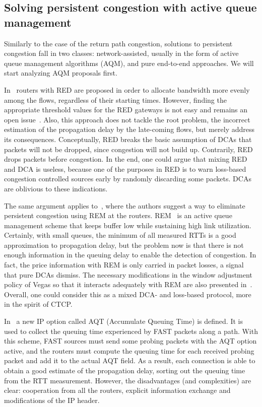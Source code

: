 \documentclass[english,times]{ettauth}
\begin{document}
\subsection{Solving persistent congestion with active queue management}
\label{sec:active-queue-manag}

Similarly to the case of the return path congestion, solutions to persistent
congestion fall in two classes: network-assisted, usually in the form of
active queue management algorithms (AQM), and pure end-to-end approaches. We
will start analyzing AQM proposals first.

In~\cite{La99} routers with RED are proposed in order to allocate bandwidth
more evenly among the flows, regardless of their starting times. However,
finding the appropriate threshold values for the RED gateways is not easy and
remains an open issue~\cite{Alemu04}. Also, this approach does not tackle the
root problem, the incorrect estimation of the propagation delay by the
late-coming flows, but merely address its consequences. Conceptually, RED
breaks the basic assumption of DCAs that packets will not be dropped, since
congestion will not build up. Contrarily, RED drops packets before congestion.
In the end, one could argue that mixing RED and DCA is useless, because one of
the purposes in RED is to warn loss-based congestion controlled sources early
by randomly discarding some packets. DCAs are oblivious to these indications.

The same argument applies to~\cite{Low02}, where the authors suggest a way to
eliminate persistent congestion using REM at the routers.
REM~\cite{Athuraliya01} is an active queue management scheme that keeps buffer
low while sustaining high link utilization. Certainly, with small queues, the
minimum of all measured RTTs is a good approximation to propagation delay, but
the problem now is that there is not enough information in the queuing delay
to enable the detection of congestion. In fact, the price information with REM
is only carried in packet losses, a signal that pure DCAs dismiss. The
necessary modifications in the window adjustment policy of Vegas so that it
interacts adequately with REM are also presented in~\cite{Low02}. Overall, one
could consider this as a mixed DCA- and loss-based protocol, more in the
spirit of CTCP.

In~\cite{Chan04} a new IP option called AQT (Accumulate Queuing Time) is
defined. It is used to collect the queuing time experienced by FAST packets
along a path.  With this scheme, FAST sources must send some probing packets
with the AQT option active, and the routers must compute the queuing time for
each received probing packet and add it to the actual AQT field. As a result,
each connection is able to obtain a good estimate of the propagation delay,
sorting out the queuing time from the RTT measurement. However, the
disadvantages (and complexities) are clear: cooperation from all the routers,
explicit information exchange and modifications of the IP header.
\end{document}

